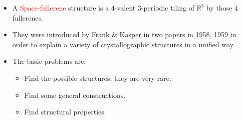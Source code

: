 \documentclass{beamer}
\newcommand{\RR}{\ensuremath{\mathbb{R}}}
\begin{document}
{\begin{itemize}
\begin{center}
\begin{minipage}[b]{24mm}
28, $T_{d}$
\end{minipage}
\end{center}
\item A \textcolor{red}{Space-fullerene} structure is a $4$-valent $3$-periodic tiling of $\RR^3$ by those $4$ fullerenes.
\item They were introduced by Frank \& Kasper in two papers in 1958, 1959 in order to explain a variety of crystallographic structures in a unified way.
\item The basic problems are:
\begin{itemize}
\item Find the possible structures, they are very rare.
\item Find some general constructions.
\item Find structural properties.
\end{itemize}

\end{itemize}
}
\end{document}
